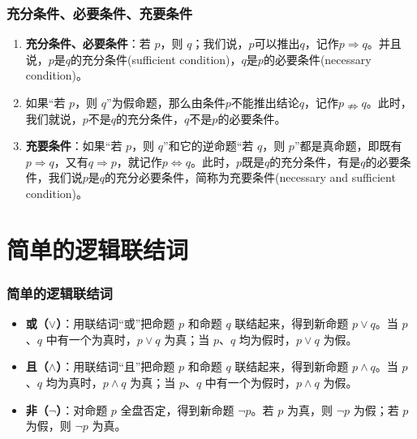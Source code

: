 \documentclass[aspectratio=169]{ctexbeamer} %
\begin{document}
\begin{frame}
\frametitle{充分条件、必要条件、充要条件}
\begin{enumerate}[label={\arabic*.}]
\item \textbf{充分条件、必要条件}：若 \(p\)，则 \(q\)；我们说，$p$可以推出$q$，记作$p \Rightarrow q$。并且说，$p$是$q$的\alert{充分条件}(sufficient condition)，$q$是$p$的\alert{必要条件}(necessary condition)。\\

\item 如果“若 \(p\)，则 \(q\)”为假命题，那么由条件$p$不能推出结论$q$，记作$p \nRightarrow q$。此时，我们就说，$p$不是$q$的\alert{充分条件}，$q$不是$p$的\alert{必要条件}。\\

\item \textbf{充要条件}：如果“若 \(p\)，则 \(q\)”和它的逆命题“若 \(q\)，则 \(p\)”都是真命题，即既有$p \Rightarrow q$，又有$q \Rightarrow p$，就记作$p \iff q$。此时，$p$既是$q$的\alert{充分条件}，有是$q$的\alert{必要条件}，我们说$p$是$q$的\alert{充分必要条件}，简称为\alert{充要条件}(necessary and sufficient condition)。

\end{enumerate}
\end{frame}

\section{简单的逻辑联结词}
\begin{frame}
\frametitle{简单的逻辑联结词}
\begin{itemize}
\item \textbf{或（\(\lor\)）}：用联结词“或”把命题 \(p\) 和命题 \(q\) 联结起来，得到新命题 \(p \lor q\)。当 \(p\)、\(q\) 中有一个为真时，\(p \lor q\) 为真；当 \(p\)、\(q\) 均为假时，\(p \lor q\) 为假。
\item \textbf{且（\(\land\)）}：用联结词“且”把命题 \(p\) 和命题 \(q\) 联结起来，得到新命题 \(p \land q\)。当 \(p\)、\(q\) 均为真时，\(p \land q\) 为真；当 \(p\)、\(q\) 中有一个为假时，\(p \land q\) 为假。
\item \textbf{非（\(\neg\)）}：对命题 \(p\) 全盘否定，得到新命题 \(\neg p\)。若 \(p\) 为真，则 \(\neg p\) 为假；若 \(p\) 为假，则 \(\neg p\) 为真。
\end{itemize}
\end{frame}
\end{document}
